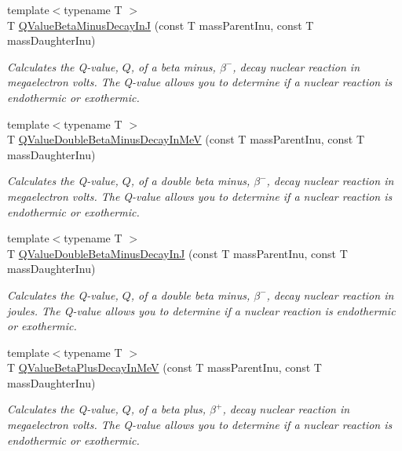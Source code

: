 \begin{DoxyCompactItemize}
{\footnotesize template$<$typename T $>$ }\\T \mbox{\hyperlink{group___e_g_x_phys-_q_value-_beta_minus_gae9a4a9f4c6e0f555e20c3144dd7329fc}{Q\+Value\+Beta\+Minus\+Decay\+InJ}} (const T mass\+Parent\+Inu, const T mass\+Daughter\+Inu)
\begin{DoxyCompactList}\small\item\em Calculates the Q-\/value, $Q$, of a beta minus, $\beta^-$, decay nuclear reaction in megaelectron volts. The Q-\/value allows you to determine if a nuclear reaction is endothermic or exothermic. \end{DoxyCompactList}\item 
{\footnotesize template$<$typename T $>$ }\\T \mbox{\hyperlink{group___e_g_x_phys-_q_value-_beta_minus_ga2678563115405a056c6bdccc9f2a9232}{Q\+Value\+Double\+Beta\+Minus\+Decay\+In\+MeV}} (const T mass\+Parent\+Inu, const T mass\+Daughter\+Inu)
\begin{DoxyCompactList}\small\item\em Calculates the Q-\/value, $Q$, of a double beta minus, $\beta^-$, decay nuclear reaction in megaelectron volts. The Q-\/value allows you to determine if a nuclear reaction is endothermic or exothermic. \end{DoxyCompactList}\item 
{\footnotesize template$<$typename T $>$ }\\T \mbox{\hyperlink{group___e_g_x_phys-_q_value-_beta_minus_ga5be6923812a1a701ed38965329dd6297}{Q\+Value\+Double\+Beta\+Minus\+Decay\+InJ}} (const T mass\+Parent\+Inu, const T mass\+Daughter\+Inu)
\begin{DoxyCompactList}\small\item\em Calculates the Q-\/value, $Q$, of a double beta minus, $\beta^-$, decay nuclear reaction in joules. The Q-\/value allows you to determine if a nuclear reaction is endothermic or exothermic. \end{DoxyCompactList}\item 
{\footnotesize template$<$typename T $>$ }\\T \mbox{\hyperlink{group___e_g_x_phys-_q_value-_beta_plus_ga3c4f7ec8e7c44d01d3aee6447a5ab443}{Q\+Value\+Beta\+Plus\+Decay\+In\+MeV}} (const T mass\+Parent\+Inu, const T mass\+Daughter\+Inu)
\begin{DoxyCompactList}\small\item\em Calculates the Q-\/value, $Q$, of a beta plus, $\beta^+$, decay nuclear reaction in megaelectron volts. The Q-\/value allows you to determine if a nuclear reaction is endothermic or exothermic. \end{DoxyCompactList}\item 

\end{DoxyCompactItemize}
